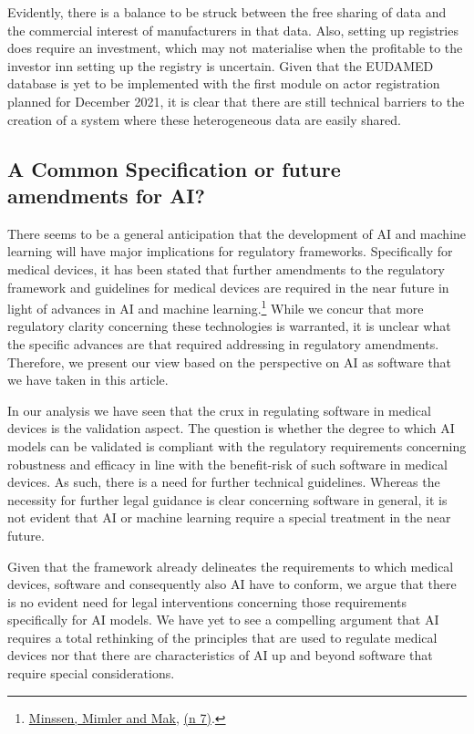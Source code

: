 \documentclass[
]{scrartcl}
\begin{document}
Evidently, there is a balance to be struck between the free sharing of data and the commercial interest of manufacturers in that data. Also, setting up registries does require an investment, which may not materialise when the profitable to the investor inn setting up the registry is uncertain. Given that the EUDAMED database is yet to be implemented with the first module on actor registration planned for December 2021, it is clear that there are still technical barriers to the creation of a system where these heterogeneous data are easily shared.

\hypertarget{a-common-specification-or-future-amendments-for-ai}{%
\subsection{A Common Specification or future amendments for AI?}\label{a-common-specification-or-future-amendments-for-ai}}

There seems to be a general anticipation that the development of AI and machine learning will have major implications for regulatory frameworks. Specifically for medical devices, it has been stated that further amendments to the regulatory framework and guidelines for medical devices are required in the near future in light of advances in AI and machine learning.\footnote{\protect\hyperlink{ref-minssenWhenDoesStandAlone2020a}{Minssen, Mimler and Mak}, \protect\hyperlink{ref-minssenWhenDoesStandAlone2020a}{(n 7)}.} While we concur that more regulatory clarity concerning these technologies is warranted, it is unclear what the specific advances are that required addressing in regulatory amendments. Therefore, we present our view based on the perspective on AI as software that we have taken in this article.

In our analysis we have seen that the crux in regulating software in medical devices is the validation aspect. The question is whether the degree to which AI models can be validated is compliant with the regulatory requirements concerning robustness and efficacy in line with the benefit-risk of such software in medical devices. As such, there is a need for further technical guidelines. Whereas the necessity for further legal guidance is clear concerning software in general, it is not evident that AI or machine learning require a special treatment in the near future.

Given that the framework already delineates the requirements to which medical devices, software and consequently also AI have to conform, we argue that there is no evident need for legal interventions concerning those requirements specifically for AI models. We have yet to see a compelling argument that AI requires a total rethinking of the principles that are used to regulate medical devices nor that there are characteristics of AI up and beyond software that require special considerations.
\end{document}
